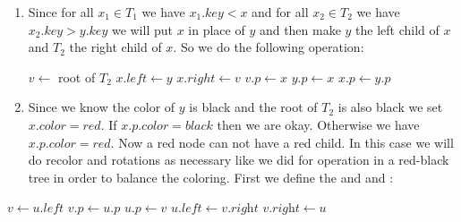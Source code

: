 \documentclass[a4paper, 11pt]{article}
\begin{document}
{\begin{algorithm}[H]
	\DontPrintSemicolon
	\caption{$(T_1,T_2.bh)$}
\end{algorithm}
\begin{enumerate}[label=(\roman*),resume]
\item Since  for all $x_1\in T_1$ we have $x_1.key<x$ and for all $x_2\in T_2$ we have $x_2.key>y.key$ we will put $x$ in place of $y$ and then make $y$ the left child of $x$ and $T_2$ the right child of $x$. So we do the following operation:
\begin{algorithm}
	\DontPrintSemicolon
	$v\longleftarrow$ root of $T_2$\;
	$x.left\longleftarrow y$\;
	$x.right\longleftarrow v$\;
	$v.p\longleftarrow x$\;
	$y.p\longleftarrow x$\;
	$x.p\longleftarrow y.p$\;
	\caption{$(y,x,T_2)$}
\end{algorithm}
\item Since we know the color of $y$ is black and the root of $T_2$ is also black  we set $x.\textit{color}=\textit{red}$. If $x.p.\textit{color}=\textit{black}$ then we are okay. Otherwise we have $x.p.\textit{color}=\textit{red}$. Now a red node can not have a red child. In this case we will do recolor and rotations as necessary like we did for  operation in  a red-black tree in order to balance the coloring. First we define the  and  and  :
\end{enumerate}
\begin{minipage}{0.48\textwidth}
	\begin{algorithm}[H]
		\DontPrintSemicolon
		$v\longleftarrow u.\textit{left}$\;
		$v.p\longleftarrow u.p$\;
		$u.p\longleftarrow v$\;
		$u.\textit{left}\longleftarrow v.\textit{right}$\;
		$v.\textit{right}\longleftarrow u$\;
		\caption{$(u)$}
	\end{algorithm}
\end{minipage}
\hfill
\begin{minipage}{0.48\textwidth}

\end{minipage}}
\end{document}
